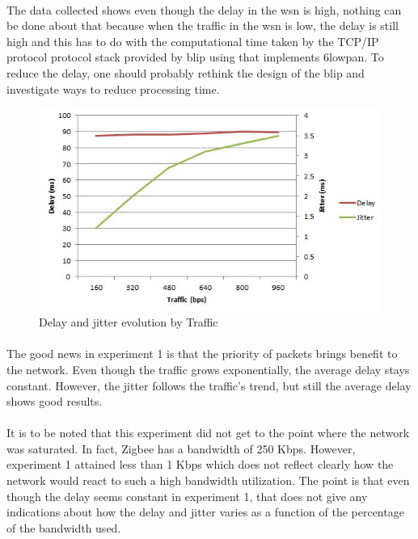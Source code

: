 \documentclass[12pt,a4paper,final]{report}
\begin{document}
\paragraph{}
The data collected shows even though the delay in the \gls{wsn} is high, 
 nothing can be done about that because when the traffic in the \gls{wsn} is low, the delay is still high and this has to do with the computational time taken by the TCP/IP protocol protocol stack provided by \gls{blip} using that implements \gls{6lowpan}. To reduce the delay, one should probably rethink the design of the \gls{blip} and investigate ways to reduce processing time.
 
 \begin{figure}[htbp]
 \centering
 \includegraphics[scale=1]{img/delay_jitter.JPG}
 \caption{Delay and jitter evolution by Traffic}
 \label{fig:delay_jitter}
 \end{figure}
 
 \paragraph{}
 The good news in experiment 1 is that the priority of packets brings benefit to the network. Even though the traffic grows exponentially, the average delay stays constant. However, the jitter follows the traffic's trend, but still the average delay shows good results. 
 \paragraph{}
 It is to be noted that this experiment did not get to the point where the network was saturated. In fact, Zigbee has a bandwidth of 250 Kbps. However, experiment 1 attained less than 1 Kbps which does not reflect clearly how the network would react to such a high bandwidth utilization. The point is that even though the delay seems constant in experiment 1, that does not give any indications about how the delay and jitter varies as a function of the percentage of the bandwidth used.
 
\end{document}
